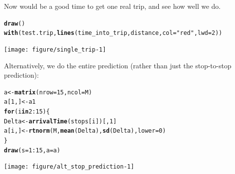 \documentclass[11pt]{article}\usepackage[]{graphicx}\usepackage[]{color}
\makeatletter
\newcommand{\hlnum}[1]{\textcolor[rgb]{0.686,0.059,0.569}{#1}}%
\newcommand{\hlstr}[1]{\textcolor[rgb]{0.192,0.494,0.8}{#1}}%
\newcommand{\hlopt}[1]{\textcolor[rgb]{0,0,0}{#1}}%
\newcommand{\hlstd}[1]{\textcolor[rgb]{0.345,0.345,0.345}{#1}}%
\newcommand{\hlkwa}[1]{\textcolor[rgb]{0.161,0.373,0.58}{\textbf{#1}}}%
\newcommand{\hlkwb}[1]{\textcolor[rgb]{0.69,0.353,0.396}{#1}}%
\newcommand{\hlkwc}[1]{\textcolor[rgb]{0.333,0.667,0.333}{#1}}%
\newcommand{\hlkwd}[1]{\textcolor[rgb]{0.737,0.353,0.396}{\textbf{#1}}}%
\newenvironment{kframe}{%
 \def\at@end@of@kframe{}%
 \ifinner\ifhmode%
  \def\at@end@of@kframe{\end{minipage}}%
  \begin{minipage}{\columnwidth}%
 \fi\fi%
 \def\FrameCommand##1{\hskip\@totalleftmargin \hskip-\fboxsep
 \colorbox{shadecolor}{##1}\hskip-\fboxsep
     \hskip-\linewidth \hskip-\@totalleftmargin \hskip\columnwidth}%
 \MakeFramed {\advance\hsize-\width
   \@totalleftmargin\z@ \linewidth\hsize
   \@setminipage}}%
 {\par\unskip\endMakeFramed%
 \at@end@of@kframe}
\newenvironment{knitrout}{}{} %
\makeatother
\begin{document}
Now would be a good time to get one real trip, and see how well we do.
\begin{knitrout}
\color{fgcolor}\begin{kframe}
\begin{alltt}
\hlkwd{draw}\hlstd{()}
\hlkwd{with}\hlstd{(test.trip,} \hlkwd{lines}\hlstd{(time_into_trip, distance,} \hlkwc{col} \hlstd{=} \hlstr{"red"}\hlstd{,} \hlkwc{lwd} \hlstd{=} \hlnum{2}\hlstd{))}
\end{alltt}
\end{kframe}
\texttt{[image: figure/single\_trip-1]} 

\end{knitrout}


Alternatively, we do the entire prediction (rather than just the stop-to-stop prediction):
\begin{knitrout}
\color{fgcolor}\begin{kframe}
\begin{alltt}
\hlstd{a} \hlkwb{<-} \hlkwd{matrix}\hlstd{(}\hlkwc{nrow} \hlstd{=} \hlnum{15}\hlstd{,} \hlkwc{ncol} \hlstd{= M)}
\hlstd{a[}\hlnum{1}\hlstd{, ]} \hlkwb{<-} \hlstd{a1}
\hlkwa{for} \hlstd{(i} \hlkwa{in} \hlnum{2}\hlopt{:}\hlnum{15}\hlstd{) \{}
    \hlstd{Delta} \hlkwb{<-} \hlkwd{arrivalTime}\hlstd{(stops[i])[,} \hlnum{1}\hlstd{]}
    \hlstd{a[i, ]} \hlkwb{<-} \hlkwd{rtnorm}\hlstd{(M,} \hlkwd{mean}\hlstd{(Delta),} \hlkwd{sd}\hlstd{(Delta),} \hlkwc{lower} \hlstd{=} \hlnum{0}\hlstd{)}
\hlstd{\}}
\hlkwd{draw}\hlstd{(}\hlkwc{s} \hlstd{=} \hlnum{1}\hlopt{:}\hlnum{15}\hlstd{,} \hlkwc{a} \hlstd{= a)}
\end{alltt}
\end{kframe}
\texttt{[image: figure/alt\_stop\_prediction-1]} 

\end{knitrout}
\end{document}
